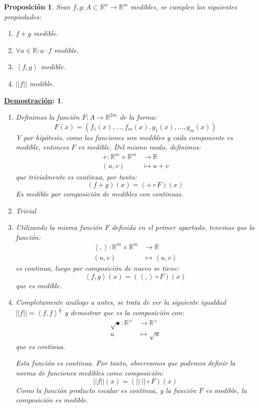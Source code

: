\documentclass[10pt,a4paper,openright]{book}
\theoremstyle{break}
\newtheorem*{prop}{Proposición}
\newtheorem*{demo}{\underline{Demostración}:}
\begin{document}
\begin{prop}
Sean $f, g: A\subset \mathbb{R}^n \rightarrow \mathbb{R}^m$ medibles, se cumplen las siguientes propiedades:
\begin{enumerate}
\item $f+g$ medible.
\item $\forall a \in \mathbb{R}: a\cdot f$ medible.
\item $\left<f, g\right>$ medible.
\item $\vert \vert f \vert \vert$ medible.
\end{enumerate}
\end{prop}
\begin{demo}
\begin{enumerate}
\item Definimos la función $F: A \rightarrow \mathbb{R}^{2m}$ de la forma:
$$F\left( x \right) = \left( f_1\left( x \right), \ldots, f_m\left( x \right), g_1\left( x \right), \ldots, g_m\left( x \right) \right)$$
Y por hipótesis, como las funciones son medibles y cada componente es medible, entonces $F$ es medible. Del mismo modo, definimos: 
\begin{align*}
+: \mathbb{R}^m \times \mathbb{R}^m & \rightarrow \mathbb{R} \\
\left( u, v \right) &\mapsto u+v
\end{align*}
que trivialmente es continua, por tanto:
$$\left( f + g \right)\left( x \right) = \left( + \circ F \right)\left( x \right)$$
Es medible por composición de medibles con continuas.

\item Trivial

\item Utilizando la misma función $F$ definida en el primer apartado, tenemos que la función:
\begin{align*}
\left<,\right>: \mathbb{R}^m \times \mathbb{R}^m & \rightarrow \mathbb{R} \\
\left( u, v \right) &\mapsto \left<u, v\right>
\end{align*}
es continua, luego por composición de nuevo se tiene:
$$\left<f, g\right> \left( x \right) = \left( \left<, \right> \circ F \right)\left( x \right)$$
que es medible.

\item Completamente análogo a antes, se trata de ver la siguiente igualdad $\vert \vert f \vert \vert = \left<f, f\right>^{\frac{1}{2}}$ y demostrar que es la composición con:
\begin{align*}
\sqrt{\text{•}}: \mathbb{R}^+ &\rightarrow \mathbb{R}^+ \\
u &\mapsto \sqrt{u}
\end{align*}
que es continua.

Esta función es continua. Por tanto, observamos que podemos definir la norma de funciones medibles como composición:
$$\vert \vert f \vert \vert \left( x \right) = \left( \vert \vert \cdot \vert \vert \circ F \right)\left( x \right)$$
Como la función producto escalar es continua, y la función $F$ es medible, la composición es medible.
\end{enumerate}
\end{demo}
\end{document}
